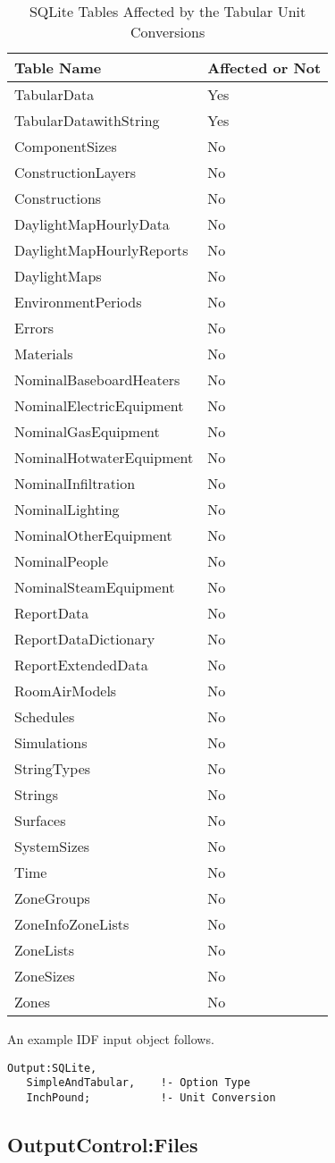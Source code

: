 {\scriptsize
\begin{longtable}[c]{p{4in}p{1in}}
\caption{SQLite Tables Affected by the Tabular Unit Conversions\label{table:tabular_unit_conversion_list}} \tabularnewline
\toprule
Table Name & Affected or Not \tabularnewline
\midrule
\endfirsthead

TabularData & Yes \tabularnewline
TabularDatawithString & Yes \tabularnewline
ComponentSizes & No \tabularnewline
ConstructionLayers & No \tabularnewline
Constructions & No \tabularnewline
DaylightMapHourlyData & No \tabularnewline
DaylightMapHourlyReports & No \tabularnewline
DaylightMaps & No \tabularnewline
EnvironmentPeriods & No \tabularnewline
Errors & No \tabularnewline
Materials & No \tabularnewline
NominalBaseboardHeaters & No \tabularnewline
NominalElectricEquipment & No \tabularnewline
NominalGasEquipment & No \tabularnewline
NominalHotwaterEquipment & No \tabularnewline
NominalInfiltration & No \tabularnewline
NominalLighting & No \tabularnewline
NominalOtherEquipment & No\tabularnewline
NominalPeople & No \tabularnewline
NominalSteamEquipment & No \tabularnewline
ReportData & No \tabularnewline
ReportDataDictionary & No \tabularnewline
ReportExtendedData & No \tabularnewline
RoomAirModels & No \tabularnewline
Schedules & No \tabularnewline
Simulations & No \tabularnewline
StringTypes & No \tabularnewline
Strings & No \tabularnewline
Surfaces & No \tabularnewline
SystemSizes & No \tabularnewline
Time & No \tabularnewline
ZoneGroups & No \tabularnewline
ZoneInfoZoneLists & No \tabularnewline
ZoneLists & No \tabularnewline
ZoneSizes & No \tabularnewline
Zones & No \tabularnewline

\bottomrule
\end{longtable}
}

An example IDF input object follows.
\begin{lstlisting}
Output:SQLite,
   SimpleAndTabular,    !- Option Type
   InchPound;           !- Unit Conversion
\end{lstlisting}

\subsection{OutputControl:Files}\label{outputcontrolfiles}

